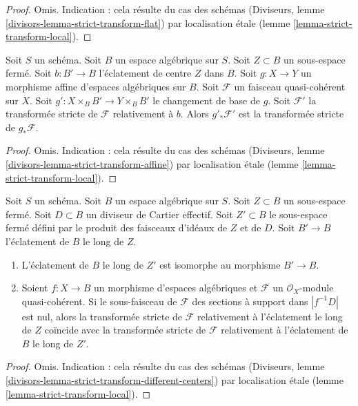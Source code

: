 \begin{proof}
Omis. Indication : cela résulte du cas des schémas
(Diviseurs, lemme \ref{divisors-lemma-strict-transform-flat})
par localisation étale
(lemme \ref{lemma-strict-transform-local}).
\end{proof}

\begin{lemma}
\label{lemma-strict-transform-affine}
Soit $S$ un schéma. Soit $B$ un espace algébrique sur $S$.
Soit $Z \subset B$ un sous-espace fermé.
Soit $b : B' \to B$ l'éclatement de centre $Z$ dans $B$. Soit
$g : X \to Y$ un morphisme affine d'espaces algébriques sur $B$.
Soit $\mathcal{F}$ un faisceau quasi-cohérent sur $X$.
Soit $g' : X \times_B B' \to Y \times_B B'$ le changement de base
de $g$. Soit $\mathcal{F}'$ la transformée stricte de $\mathcal{F}$
relativement à $b$. Alors $g'_*\mathcal{F}'$ est la transformée stricte
de $g_*\mathcal{F}$.
\end{lemma}

\begin{proof}
Omis. Indication : cela résulte du cas des schémas
(Diviseurs, lemme \ref{divisors-lemma-strict-transform-affine})
par localisation étale (lemme \ref{lemma-strict-transform-local}).
\end{proof}

\begin{lemma}
\label{lemma-strict-transform-different-centers}
Soit $S$ un schéma. Soit $B$ un espace algébrique sur $S$.
Soit $Z \subset B$ un sous-espace fermé.
Soit $D \subset B$ un diviseur de Cartier effectif.
Soit $Z' \subset B$ le sous-espace fermé défini par le produit
des faisceaux d'idéaux de $Z$ et de $D$.
Soit $B' \to B$ l'éclatement de $B$ le long de $Z$.
\begin{enumerate}
\item L'éclatement de $B$ le long de $Z'$ est isomorphe au morphisme $B' \to B$.
\item Soient $f : X \to B$ un morphisme d'espaces algébriques et $\mathcal{F}$
un $\mathcal{O}_X$-module quasi-cohérent. Si le sous-faisceau de $\mathcal{F}$ des
sections à support dans $|f^{-1}D|$ est nul, alors la
transformée stricte de $\mathcal{F}$ relativement à l'éclatement
le long de $Z$ coïncide avec la transformée stricte de $\mathcal{F}$ relativement
à l'éclatement de $B$ le long de $Z'$.
\end{enumerate}
\end{lemma}

\begin{proof}
Omis. Indication : cela résulte du cas des schémas
(Diviseurs, lemme \ref{divisors-lemma-strict-transform-different-centers})
par localisation étale (lemme \ref{lemma-strict-transform-local}).
\end{proof}

